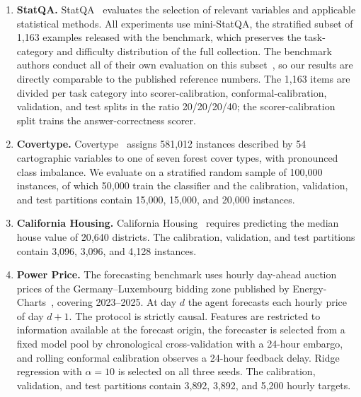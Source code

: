 \documentclass[preprint,12pt,authoryear]{elsarticle}
\begin{document}
\begin{enumerate}
    \renewcommand{\labelenumi}{\arabic{enumi}.}
    \setlength{\itemsep}{6pt}
    

    \item \textbf{StatQA.}
    StatQA~\citep{zhu2024large} evaluates the selection of relevant variables and applicable statistical methods.
    All experiments use mini-StatQA, the stratified subset of 1{,}163 examples released with the benchmark, which preserves the task-category and difficulty distribution of the full collection.
    The benchmark authors conduct all of their own evaluation on this subset~\citep{zhu2024large}, so our results are directly comparable to the published reference numbers.
    The 1{,}163 items are divided per task category into scorer-calibration, conformal-calibration, validation, and test splits in the ratio 20/20/20/40; the scorer-calibration split trains the answer-correctness scorer.

    \item \textbf{Covertype.}
    Covertype~\citep{blackard1999comparative} assigns 581{,}012 instances described by 54 cartographic variables to one of seven forest cover types, with pronounced class imbalance.
    We evaluate on a stratified random sample of 100{,}000 instances, of which 50{,}000 train the classifier and the calibration, validation, and test partitions contain 15{,}000, 15{,}000, and 20{,}000 instances.

    \item \textbf{California Housing.}
    California Housing~\citep{pace1997sparse} requires predicting the median house value of 20{,}640 districts.
    The calibration, validation, and test partitions contain 3{,}096, 3{,}096, and 4{,}128 instances.

    \item \textbf{Power Price.}
    The forecasting benchmark uses hourly day-ahead auction prices of the Germany--Luxembourg bidding zone published by Energy-Charts~\citep{energycharts2025}, covering 2023--2025.
    At day $d$ the agent forecasts each hourly price of day $d{+}1$.
    The protocol is strictly causal. Features are restricted to information available at the forecast origin, the forecaster is selected from a fixed model pool by chronological cross-validation with a 24-hour embargo, and rolling conformal calibration observes a 24-hour feedback delay.
    Ridge regression with $\alpha=10$ is selected on all three seeds.
    The calibration, validation, and test partitions contain 3{,}892, 3{,}892, and 5{,}200 hourly targets.

\end{enumerate}
\end{document}
